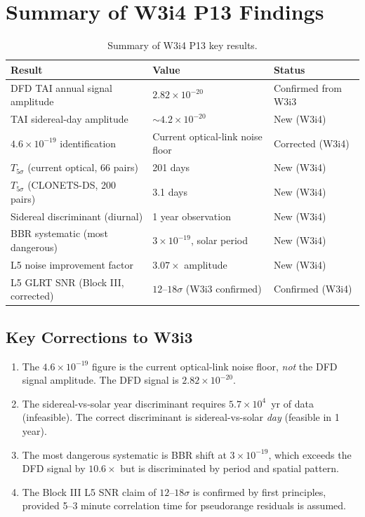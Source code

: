 \documentclass[aps,prd,twocolumn,superscriptaddress,nofootinbib]{revtex4-2}
\begin{document}
\section{Summary of W3i4 P13 Findings}
\label{sec:summary}

\begin{table}[h]
\caption{Summary of W3i4 P13 key results.}
\label{tab:summary}
\begin{ruledtabular}
\begin{tabular}{lll}
Result & Value & Status \\
\hline
DFD TAI annual signal amplitude & $2.82\times10^{-20}$ & Confirmed from W3i3 \\
TAI sidereal-day amplitude & $\sim 4.2\times10^{-20}$ & New (W3i4) \\
$4.6\times10^{-19}$ identification & Current optical-link noise floor & Corrected (W3i4) \\
$T_{5\sigma}$ (current optical, 66 pairs) & 201 days & New (W3i4) \\
$T_{5\sigma}$ (CLONETS-DS, 200 pairs) & 3.1 days & New (W3i4) \\
Sidereal discriminant (diurnal) & 1 year observation & New (W3i4) \\
BBR systematic (most dangerous) & $3\times10^{-19}$, solar period & New (W3i4) \\
L5 noise improvement factor & $3.07\times$ amplitude & New (W3i4) \\
L5 GLRT SNR (Block III, corrected) & $12$--$18\sigma$ (W3i3 confirmed) & Confirmed (W3i4) \\
\end{tabular}
\end{ruledtabular}
\end{table}

\subsection{Key Corrections to W3i3}

\begin{enumerate}
\item The $4.6\times10^{-19}$ figure is the current optical-link noise floor,
      \emph{not} the DFD signal amplitude. The DFD signal is $2.82\times10^{-20}$.
\item The sidereal-vs-solar year discriminant requires $5.7\times10^4$~yr of
      data (infeasible). The correct discriminant is sidereal-vs-solar \emph{day}
      (feasible in 1 year).
\item The most dangerous systematic is BBR shift at $3\times10^{-19}$, which
      exceeds the DFD signal by $10.6\times$ but is discriminated by period
      and spatial pattern.
\item The Block III L5 SNR claim of $12$--$18\sigma$ is confirmed by first
      principles, provided 5--3 minute correlation time for pseudorange
      residuals is assumed.
\end{enumerate}
\end{document}

